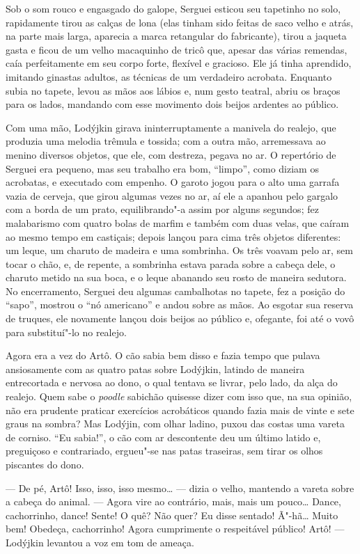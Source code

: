 Sob o som rouco e engasgado do galope, Serguei esticou seu tapetinho no
solo, rapidamente tirou as calças de lona (elas tinham sido feitas de
saco velho e atrás, na parte mais larga, aparecia a marca retangular do
fabricante), tirou a jaqueta gasta e ficou de um velho macaquinho de
tricô que, apesar das várias remendas, caía perfeitamente em seu corpo
forte, flexível e gracioso. Ele já tinha aprendido, imitando ginastas
adultos, as técnicas de um verdadeiro acrobata. Enquanto subia no
tapete, levou as mãos aos lábios e, num gesto teatral, abriu os braços
para os lados, mandando com esse movimento dois beijos ardentes ao
público.

Com uma mão, Lodýjkin girava ininterruptamente a manivela do realejo,
que produzia uma melodia trêmula e tossida; com a outra mão, arremessava
ao menino diversos objetos, que ele, com destreza, pegava no ar. O
repertório de Serguei era pequeno, mas seu trabalho era bom, ``limpo'',
como diziam os acrobatas, e executado com empenho. O garoto jogou para o
alto uma garrafa vazia de cerveja, que girou algumas vezes no ar, aí ele
a apanhou pelo gargalo com a borda de um prato, equilibrando"-a assim por
alguns segundos; fez malabarismo com quatro bolas de marfim e também com
duas velas, que caíram ao mesmo tempo em castiçais; depois lançou para
cima três objetos diferentes: um leque, um charuto de madeira e uma
sombrinha. Os três voavam pelo ar, sem tocar o chão, e, de repente, a
sombrinha estava parada sobre a cabeça dele, o charuto metido na sua
boca, e o leque abanando seu rosto de maneira sedutora. No encerramento,
Serguei deu algumas cambalhotas no tapete, fez a posição do ``sapo'', mostrou o ``nó americano'' e andou sobre as mãos. Ao esgotar sua
reserva de truques, ele novamente lançou dois beijos ao público e,
ofegante, foi até o vovô para substituí"-lo no realejo.

Agora era a vez do Artô. O cão sabia bem disso e fazia tempo que pulava
ansiosamente com as quatro patas sobre Lodýjkin, latindo de maneira
entrecortada e nervosa ao dono, o qual tentava se livrar, pelo lado, da
alça do realejo. Quem sabe o \emph{poodle} sabichão quisesse dizer com
isso que, na sua opinião, não era prudente praticar exercícios
acrobáticos quando fazia mais de vinte e sete graus na sombra? Mas
Lodýjin, com olhar ladino, puxou das costas uma vareta de corniso. ``Eu
sabia!'', o cão com ar descontente deu um último latido e, preguiçoso e
contrariado, ergueu"-se nas patas traseiras, sem tirar os olhos piscantes
do dono.

--- De pé, Artô! Isso, isso, isso mesmo\ldots{} --- dizia o velho, mantendo a
vareta sobre a cabeça do animal. --- Agora vire ao contrário, mais, mais
um pouco\ldots{} Dance, cachorrinho, dance! Sente! O quê? Não quer? Eu disse
sentado! Ã"-hã\ldots{} Muito bem! Obedeça, cachorrinho! Agora cumprimente o
respeitável público! Artô! --- Lodýjkin levantou a voz em tom de ameaça.

